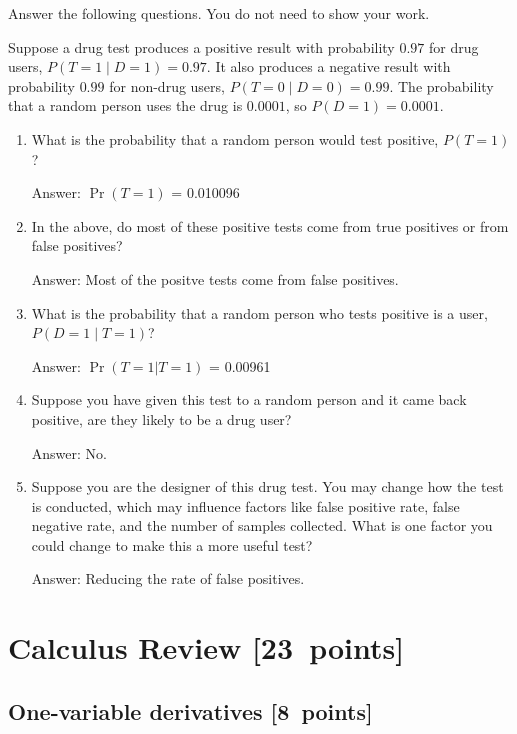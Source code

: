 \documentclass{article}
\newcommand{\blu}[1]{{\textcolor{blu}{#1}}}
\newenvironment{answer}{\par\begingroup\color{gre}Answer: }{\endgroup}
\let\ask\blu
\newcommand\pts[1]{\textcolor{pointscolour}{[#1~points]}}
\begin{document}
  \ask{Answer the following questions.} You do not need to show your work.

  Suppose a drug test produces a positive result with probability $0.97$ for drug users, $P(T=1 \mid D=1)=0.97$. It also produces a negative result with probability $0.99$ for non-drug users, $P(T=0 \mid D=0)=0.99$. The probability that a random person uses the drug is $0.0001$, so $P(D=1)=0.0001$.

  \begin{enumerate}
  \item What is the probability that a random person would test positive, $P(T=1)$?
  \begin{answer}
    $\Pr(T = 1)$ = 0.010096
  \end{answer}
  \item In the above, do most of these positive tests come from true positives or from false positives?
  \begin{answer}
    Most of the positve tests come from false positives.
  \end{answer}
  \item What is the probability that a random person who tests positive is a user, $P(D=1 \mid T=1)$?
  \begin{answer}
    $\Pr(T = 1 | T = 1)$ = 0.00961
  \end{answer}
  \item Suppose you have given this test to a random person and it came back positive, are they likely to be a drug user?
  \begin{answer}
    No.
  \end{answer}
  \item Suppose you are the designer of this drug test. You may change how the test is conducted, which may influence factors like false positive rate, false negative rate, and the number of samples collected. What is one factor you could change to make this a more useful test?
  \begin{answer}
    Reducing the rate of false positives.
  \end{answer}
  \end{enumerate}


  \clearpage\section{Calculus Review \pts{23}}



  \subsection{One-variable derivatives \pts{8}}
  \label{sub.one.var}
\end{document}
